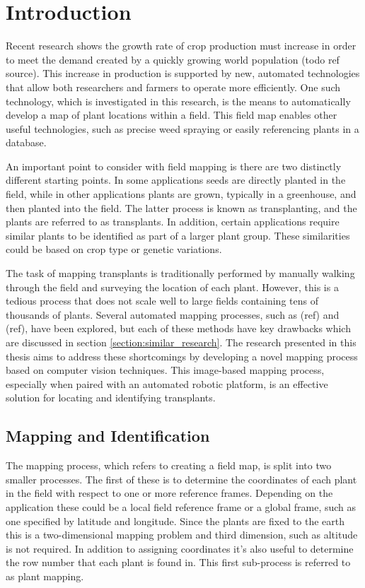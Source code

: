 
\cleardoublepage

\chapter{Introduction}
\label{introduction}

Recent research shows the growth rate of crop production must increase in order to meet the demand created by a quickly growing world population (todo ref source).  This increase in production is supported by new, automated technologies that allow both researchers and farmers to operate more efficiently.  One such technology, which is investigated in this research, is the means to automatically develop a map of plant locations within a field.  This field map enables other useful technologies, such as precise weed spraying or easily referencing plants in a database. 
 
An important point to consider with field mapping is there are two distinctly different starting points.  In some applications seeds are directly planted in the field, while in other applications plants are grown, typically in a greenhouse, and then planted into the field.  The latter process is known as transplanting, and the plants are referred to as transplants.  In addition, certain applications require similar plants to be identified as part of a larger plant group.  These similarities could be based on crop type or genetic variations. 

The task of mapping transplants is traditionally performed by manually walking through the field and surveying the location of each plant. However, this is a tedious process that does not scale well to large fields containing tens of thousands of plants.  Several automated mapping processes, such as (ref) and (ref), have been explored, but each of these methods have key drawbacks which are discussed in section \ref{section:similar_research}.  The research presented in this thesis aims to address these shortcomings by developing a novel mapping process based on computer vision techniques.  This image-based mapping process, especially when paired with an automated robotic platform, is an effective solution for locating and identifying transplants. 

\section{Mapping and Identification}

The mapping process, which refers to creating a field map, is split into two smaller processes.  The first of these is to determine the coordinates of each plant in the field with respect to one or more reference frames.  Depending on the application these could be a local field reference frame or a global frame, such as one specified by latitude and longitude.  Since the plants are fixed to the earth this is a two-dimensional mapping problem and third dimension, such as altitude is not required.  In addition to assigning coordinates it's also useful to determine the row number that each plant is found in.  This first sub-process is referred to as plant mapping. 

